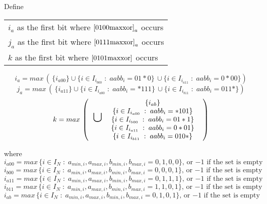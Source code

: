 \documentclass{article}
\begin{document}
Define 
\begin{tabular}{l}
$i_a$ as the first bit where $\eqref{0100maxxor}_a$ occurs\\
$j_a$ as the first bit where $\eqref{0111maxxor}_a$ occurs\\
$k$ as the first bit where $\eqref{0101maxxor}$ occurs
\end{tabular}
\begin{equation*}
i_a = 
max \, ( \, \{i_{a00}\} \cup 
\{i \in I_{i_{b00}}\; : \; aabb_i = 01*0\} \, \cup
\{i \in I_{i_{a11}}\; : \; aabb_i = 0*00\} 
) 
\end{equation*}
\begin{equation*}
j_a = 
max \, ( \, \{i_{a11}\} \cup 
\{i \in I_{i_{a00}}\; : \; aabb_i = *111\} \, \cup
\{i \in I_{i_{b11}}\; : \; aabb_i = 011*\} 
) 
\end{equation*}
\begin{equation*}
k = max \, 
\left(
\begin{tabular}{l c}
\huge $\cup$ \normalsize
\begin{tabular}{c}
$\{i_{ab}\}$\\
$\{i \in I_{i_{a00}}\; : \; aabb_i = *101\} $\\
$\{i \in I_{i_{b00}}\; : \; aabb_i = 01*1\} $\\
$\{i \in I_{i_{a11}}\; : \; aabb_i = 0*01\} $\\
$\{i \in I_{i_{b11}}\; : \; aabb_i = 010*\} $\\
\end{tabular}
\end{tabular}
\right)
\end{equation*}

    where
\begin{equation*}
i_{a00} = max \, \{i \in I_N\; : \; 
a_{min,i}, a_{max,i},b_{min,i},b_{max,i} = 0,1,0,0\},\,
\text{or $-1$ if the set is empty}
\end{equation*}
\begin{equation*}
i_{b00} = max \, \{i \in I_N\; : \; 
a_{min,i}, a_{max,i},b_{min,i},b_{max,i} = 0,0,0,1\},\,
\text{or $-1$ if the set is empty}
\end{equation*}
\begin{equation*}
i_{a11} = max \, \{i \in I_N\; : \; 
a_{min,i}, a_{max,i},b_{min,i},b_{max,i} = 0,1,1,1\},\,
\text{or $-1$ if the set is empty}
\end{equation*}
\begin{equation*}
i_{b11} = max \, \{i \in I_N\; : \; 
a_{min,i}, a_{max,i},b_{min,i},b_{max,i} = 1,1,0,1\},\,
\text{or $-1$ if the set is empty}
\end{equation*}
\begin{equation*}
i_{ab} = max \, \{i \in I_N\; : \; 
a_{min,i}, a_{max,i},b_{min,i},b_{max,i} = 0,1,0,1\},\,
\text{or $-1$ if the set is empty}
\end{equation*}
\end{document}
